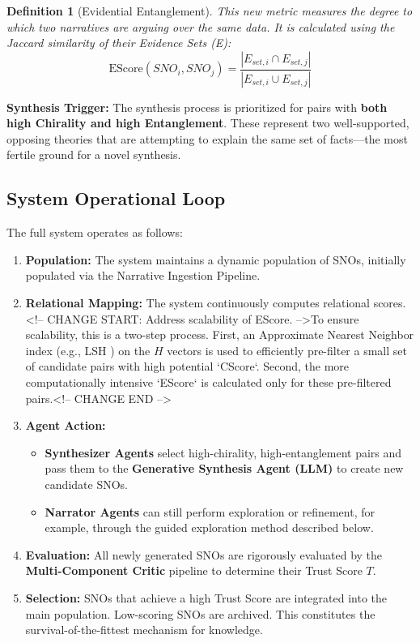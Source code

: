 \documentclass[12pt, a4paper]{article}
\newtheorem{definition}{Definition}[section]
\begin{document}
\begin{definition}[Evidential Entanglement]
This new metric measures the degree to which two narratives are arguing over the same data. It is calculated using the Jaccard similarity of their \textit{Evidence Sets (E)}:
\[
\text{EScore}(SNO_i, SNO_j) = \frac{|E_{set, i} \cap E_{set, j}|}{|E_{set, i} \cup E_{set, j}|}
\]
\end{definition}

\textbf{Synthesis Trigger:} The synthesis process is prioritized for pairs with \textbf{both high Chirality and high Entanglement}. These represent two well-supported, opposing theories that are attempting to explain the same set of facts—the most fertile ground for a novel synthesis.

\subsection{System Operational Loop}
The full system operates as follows:
\begin{enumerate}
    \item \textbf{Population:} The system maintains a dynamic population of SNOs, initially populated via the Narrative Ingestion Pipeline.
    \item \textbf{Relational Mapping:} The system continuously computes relational scores. <!-- CHANGE START: Address scalability of EScore. -->To ensure scalability, this is a two-step process. First, an Approximate Nearest Neighbor index (e.g., LSH \cite{Indyk1998LSH}) on the $H$ vectors is used to efficiently pre-filter a small set of candidate pairs with high potential `CScore`. Second, the more computationally intensive `EScore` is calculated only for these pre-filtered pairs.<!-- CHANGE END -->
    \item \textbf{Agent Action:}
        \begin{itemize}
            \item \textbf{Synthesizer Agents} select high-chirality, high-entanglement pairs and pass them to the \textbf{Generative Synthesis Agent (LLM)} to create new candidate SNOs.
            \item \textbf{Narrator Agents} can still perform exploration or refinement, for example, through the guided exploration method described below.
        \end{itemize}
    \item \textbf{Evaluation:} All newly generated SNOs are rigorously evaluated by the \textbf{Multi-Component Critic} pipeline to determine their Trust Score $T$.
    \item \textbf{Selection:} SNOs that achieve a high Trust Score are integrated into the main population. Low-scoring SNOs are archived. This constitutes the survival-of-the-fittest mechanism for knowledge.
\end{enumerate}
\end{document}
